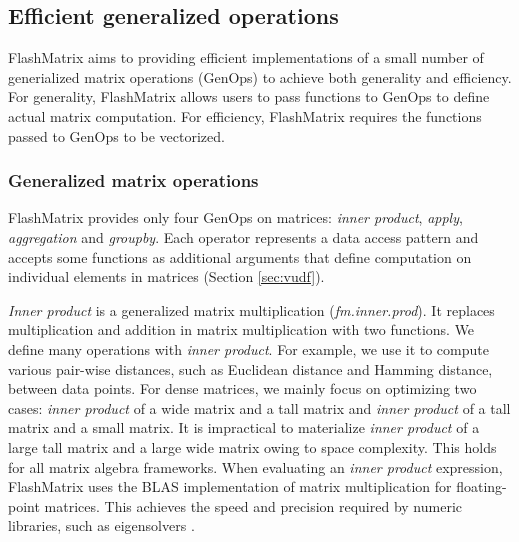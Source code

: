 
\subsection{Efficient generalized operations}
FlashMatrix aims to providing efficient implementations of a small number of
generialized matrix operations (GenOps) to achieve both generality and
efficiency. For generality, FlashMatrix allows users to pass functions to
GenOps to define actual matrix computation. For efficiency, FlashMatrix
requires the functions passed to GenOps to be vectorized.

\subsubsection{Generalized matrix operations} \label{sec:genop}
FlashMatrix provides only four GenOps on matrices: \textit{inner product},
\textit{apply}, \textit{aggregation} and \textit{groupby}. Each operator
represents a data access pattern and accepts some functions as additional
arguments that define computation on individual elements in matrices (Section
\ref{sec:vudf}).

\textit{Inner product} is a generalized matrix multiplication (\textit{fm.inner.prod}).
It replaces multiplication and addition in matrix multiplication with two functions.
We define many operations with \textit{inner product}. For example, we use it
to compute various pair-wise distances, such as Euclidean distance and Hamming
distance, between data points. For dense matrices, we mainly focus on optimizing
two cases: \textit{inner product} of a wide matrix and a tall matrix and
\textit{inner product} of a tall matrix and a small matrix. It is impractical to
materialize \textit{inner product} of a large tall matrix and a large wide matrix
owing to space complexity. This holds for all matrix algebra frameworks.
When evaluating an \textit{inner product} expression, FlashMatrix uses the BLAS
implementation of matrix multiplication for floating-point matrices.
This achieves the speed and precision required by
numeric libraries, such as eigensolvers \cite{anasazi, FlashEigen}.

